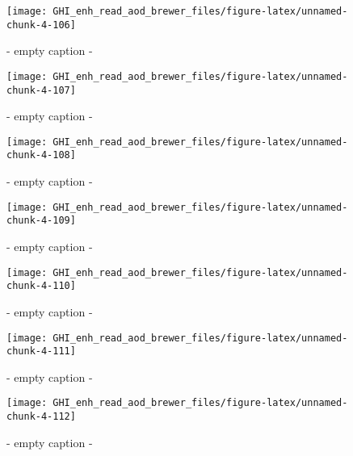 \documentclass[
  10pt,
  a4paper,oneside]{article}
\begin{document}
\begin{figure}[H]

{\centering \texttt{[image: GHI\_enh\_read\_aod\_brewer\_files/figure-latex/unnamed-chunk-4-106]} 

}

\caption{ - empty caption - }\label{fig:unnamed-chunk-4-106}
\end{figure}
\begin{figure}[H]

{\centering \texttt{[image: GHI\_enh\_read\_aod\_brewer\_files/figure-latex/unnamed-chunk-4-107]} 

}

\caption{ - empty caption - }\label{fig:unnamed-chunk-4-107}
\end{figure}
\begin{figure}[H]

{\centering \texttt{[image: GHI\_enh\_read\_aod\_brewer\_files/figure-latex/unnamed-chunk-4-108]} 

}

\caption{ - empty caption - }\label{fig:unnamed-chunk-4-108}
\end{figure}
\begin{figure}[H]

{\centering \texttt{[image: GHI\_enh\_read\_aod\_brewer\_files/figure-latex/unnamed-chunk-4-109]} 

}

\caption{ - empty caption - }\label{fig:unnamed-chunk-4-109}
\end{figure}
\begin{figure}[H]

{\centering \texttt{[image: GHI\_enh\_read\_aod\_brewer\_files/figure-latex/unnamed-chunk-4-110]} 

}

\caption{ - empty caption - }\label{fig:unnamed-chunk-4-110}
\end{figure}
\begin{figure}[H]

{\centering \texttt{[image: GHI\_enh\_read\_aod\_brewer\_files/figure-latex/unnamed-chunk-4-111]} 

}

\caption{ - empty caption - }\label{fig:unnamed-chunk-4-111}
\end{figure}
\begin{figure}[H]

{\centering \texttt{[image: GHI\_enh\_read\_aod\_brewer\_files/figure-latex/unnamed-chunk-4-112]} 

}

\caption{ - empty caption - }\label{fig:unnamed-chunk-4-112}
\end{figure}
\end{document}
